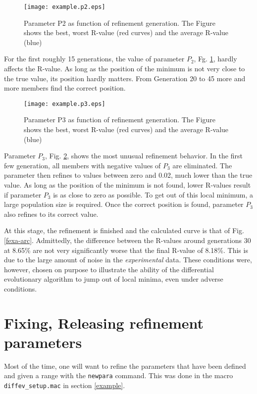 \begin{figure}
   \texttt{[image: example.p2.eps]}
   \caption{Parameter P2 as function of refinement generation. The Figure
            shows the best, worst R-value (red curves) and the average
            R-value (blue)}
   \label{fexa-p2}
\end{figure}

For the first roughly 15 generations, the value of parameter $P_{2}$,
Fg. \ref{fexa-p2}, hardly affects the R-value. As long as the position 
of the minimum is
not very close to the true value, its position hardly matters. 
From Generation 20 to 45 more and more members find the correct 
position.

\begin{figure}
   \texttt{[image: example.p3.eps]}
   \caption{Parameter P3 as function of refinement generation. The Figure
            shows the best, worst R-value (red curves) and the average
            R-value (blue)}
   \label{fexa-p3}
\end{figure}

Parameter $P_{3}$, Fig. \ref{fexa-p3}, shows the most unusual refinement 
behavior. In the 
first few generation, all members with negative values of $P_{3}$ are
eliminated. The parameter then refines to values between zero and 0.02,
much lower than the true value. As long as the position of the minimum
is not found, lower R-values result if parameter $P_{3}$ is as close
to zero as possible. To get out of this local minimum, a large 
population size is required. Once the correct position is found,
parameter $P_{3}$ also refines to its correct value.

At this stage, the refinement is finished and the calculated curve 
is that of Fig. \ref{fexa-arc}. Admittedly, the difference between
the R-values around generations 30 at 8.65\% are not very 
significantly worse that the final R-value of 8.18\%. This is due to
the large amount of noise in the {\em experimental} data. 
These conditions were, however, chosen on purpose to illustrate
the ability of the differential evolutionary algorithm to jump out
of local minima, even under adverse conditions.

\section{Fixing, Releasing refinement parameters}

Most of the time, one will want to refine the parameters that have 
been defined and given a range with the {\tt newpara} command. 
This was done in the macro {\tt diffev\_setup.mac} in section
\ref{example}.

